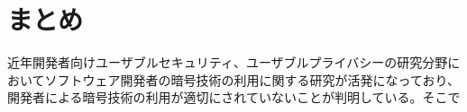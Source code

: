 \newpage
\section{まとめ}

近年開発者向けユーザブルセキュリティ、ユーザブルプライバシーの研究分野においてソフトウェア開発者の暗号技術の利用に関する研究が活発になっており、
開発者による暗号技術の利用が適切にされていないことが判明している。そこで